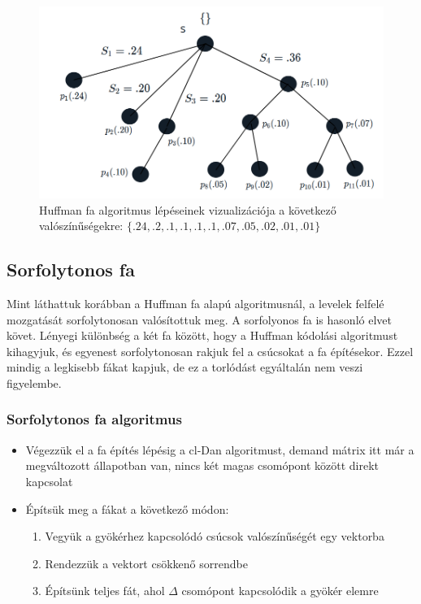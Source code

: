 \documentclass[12pt]{report}
\begin{document}
\begin{figure}[H]
\begin{center}
		\includegraphics[width=0.49\linewidth]{pictures/huffman6.png}
		\caption{Huffman fa algoritmus lépéseinek vizualizációja a következő valószínűségekre: 
			 \( \{.24, .2, .1, .1, .1, .1, .07, .05, .02, .01, .01\}\) }
		\label{huffman-algorithm}
	\end{center}
\end{figure}


\subsection{Sorfolytonos fa}

Mint láthattuk korábban a Huffman fa alapú algoritmusnál, a levelek felfelé mozgatását sorfolytonosan valósítottuk meg. A sorfolyonos fa is hasonló elvet követ.
Lényegi különbség a két fa között, hogy a Huffman kódolási algoritmust kihagyjuk, és egyenest sorfolytonosan rakjuk fel a csúcsokat a fa építésekor.
Ezzel mindig a legkisebb fákat kapjuk, de ez a torlódást egyáltalán nem veszi figyelembe.

\subsubsection{Sorfolytonos fa algoritmus}
\begin{itemize}
	\item Végezzük el a fa építés lépésig a cl-Dan algoritmust, demand mátrix itt már a megváltozott állapotban van, nincs két magas csomópont között direkt kapcsolat
	\item Építsük meg a fákat a következő módon:
	\begin{enumerate}
		\item Vegyük a gyökérhez kapcsolódó csúcsok valószínűségét egy vektorba
		\item Rendezzük a vektort csökkenő sorrendbe
		\item Építsünk teljes fát, ahol $\Delta$ csomópont kapcsolódik a gyökér elemre
	\end{enumerate}
\end{itemize}
\end{document}
